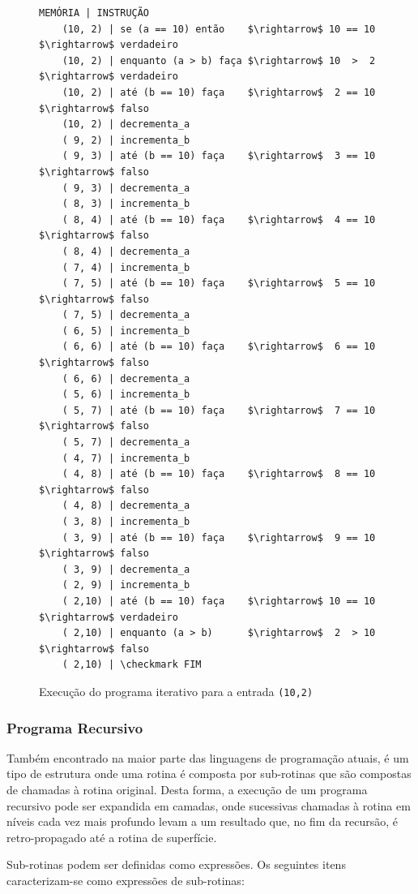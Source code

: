 \documentclass[12pt,fleqn]{article}
\begin{document}
\begin{figure}[H]
\begin{Verbatim}[commandchars=\\\{\},codes={\catcode`\$=3\catcode`\^=7}]
    MEMÓRIA | INSTRUÇÃO
    (10, 2) | se (a == 10) então    $\rightarrow$ 10 == 10 $\rightarrow$ verdadeiro
    (10, 2) | enquanto (a > b) faça $\rightarrow$ 10  >  2 $\rightarrow$ verdadeiro
    (10, 2) | até (b == 10) faça    $\rightarrow$  2 == 10 $\rightarrow$ falso
    (10, 2) | decrementa_a
    ( 9, 2) | incrementa_b
    ( 9, 3) | até (b == 10) faça    $\rightarrow$  3 == 10 $\rightarrow$ falso
    ( 9, 3) | decrementa_a
    ( 8, 3) | incrementa_b
    ( 8, 4) | até (b == 10) faça    $\rightarrow$  4 == 10 $\rightarrow$ falso
    ( 8, 4) | decrementa_a
    ( 7, 4) | incrementa_b
    ( 7, 5) | até (b == 10) faça    $\rightarrow$  5 == 10 $\rightarrow$ falso
    ( 7, 5) | decrementa_a
    ( 6, 5) | incrementa_b
    ( 6, 6) | até (b == 10) faça    $\rightarrow$  6 == 10 $\rightarrow$ falso
    ( 6, 6) | decrementa_a
    ( 5, 6) | incrementa_b
    ( 5, 7) | até (b == 10) faça    $\rightarrow$  7 == 10 $\rightarrow$ falso
    ( 5, 7) | decrementa_a
    ( 4, 7) | incrementa_b
    ( 4, 8) | até (b == 10) faça    $\rightarrow$  8 == 10 $\rightarrow$ falso
    ( 4, 8) | decrementa_a
    ( 3, 8) | incrementa_b
    ( 3, 9) | até (b == 10) faça    $\rightarrow$  9 == 10 $\rightarrow$ falso
    ( 3, 9) | decrementa_a
    ( 2, 9) | incrementa_b
    ( 2,10) | até (b == 10) faça    $\rightarrow$ 10 == 10 $\rightarrow$ verdadeiro
    ( 2,10) | enquanto (a > b)      $\rightarrow$  2  > 10 $\rightarrow$ falso
    ( 2,10) | \checkmark FIM
\end{Verbatim}
\caption{Execução do programa iterativo para a entrada \texttt{(10,2)}}
\end{figure}

\subsubsection{Programa Recursivo}
Também encontrado na maior parte das linguagens de programação atuais, é um
tipo de estrutura onde uma rotina é composta por sub-rotinas que são compostas
de chamadas à rotina original. Desta forma, a execução de um programa recursivo
pode ser expandida em camadas, onde sucessivas chamadas à rotina em níveis cada
vez mais profundo levam a um resultado que, no fim da recursão, é
retro-propagado até a rotina de superfície.

Sub-rotinas podem ser definidas como expressões. Os seguintes itens
caracterizam-se como expressões de sub-rotinas:
\end{document}
